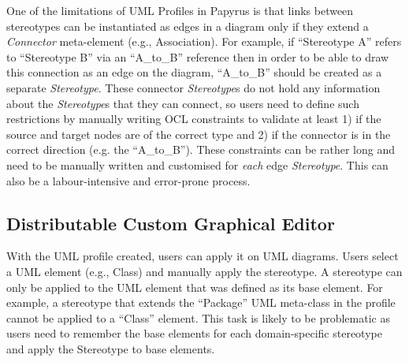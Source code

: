 One of the limitations of UML Profiles in Papyrus is that links between stereotypes can be instantiated as edges in a diagram only if they extend a \textit{Connector} meta-element (e.g., Association).  
For example, if ``Stereotype A'' refers to ``Stereotype B'' via an ``A\_to\_B'' reference then in order to be able to draw this connection as an edge on the diagram, ``A\_to\_B'' should be created as a separate \textit{Stereotype}. 
These connector \textit{Stereotype}s do not hold any information about the \textit{Stereotype}s that they can connect, so users need to define such restrictions by manually writing OCL constraints to validate at least 1) if the source and target nodes are of the correct type and 2) if the connector is in the correct direction (e.g. the ``A\_to\_B''). 
These constraints can be rather long and need to be manually written and customised for \textit{each} edge \textit{Stereotype}. This can also be a labour-intensive and error-prone process.

\subsection{Distributable Custom Graphical Editor}
With the UML profile created, users can apply it on UML diagrams. 
Users select a UML element (e.g., Class) and manually apply the stereotype. 
A stereotype can only be applied to the UML element that was defined as its base element. 
For example, a stereotype that extends the ``Package'' UML meta-class in the profile cannot be applied to a ``Class'' element. 
This task is likely to be problematic as users need to remember the base elements for each domain-specific stereotype and apply the Stereotype to base elements. 


